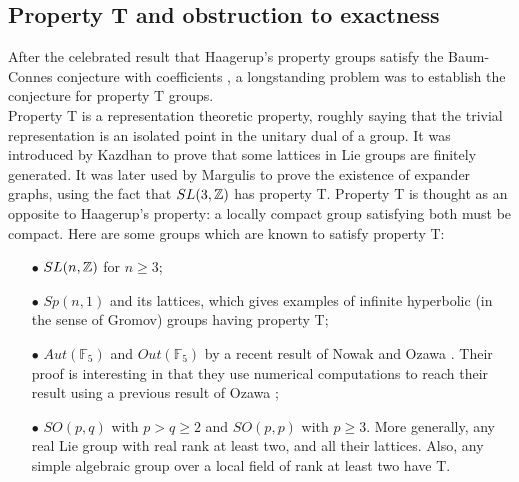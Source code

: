 \begin{enumerate}

\end{enumerate}

\subsection{Property T and obstruction to exactness}

After the celebrated result that Haagerup's property groups satisfy the Baum-Connes conjecture with coefficients \cite{HigsonKasparov}, a longstanding problem was to establish the conjecture for property T groups. \\

Property T is a representation theoretic property, roughly saying that the trivial representation is an isolated point in the unitary dual of a group. It was introduced by Kazdhan \cite{kazhdan} to prove that some lattices in Lie groups are finitely generated. It was later used by Margulis to prove the existence of expander graphs, using the fact that $SL(3, \mathbb{Z})$ has property T. Property T is thought as an opposite to Haagerup's property: a locally compact group satisfying both must be compact. Here are some groups which are known to satisfy property T: 

\begin{itemize}
\item[$\bullet$] $SL(n,\mathbb{Z})$ for $n\geq 3$;  
\item[$\bullet$] $Sp(n,1)$ and its lattices, which gives examples of infinite hyperbolic (in the sense of Gromov) groups having property T;
\item[$\bullet$] $Aut(\mathbb F_5)$ and $Out(\mathbb F_5)$ by a recent result of Nowak and Ozawa \cite{NowakOzawaF5}. Their proof is interesting in that they use numerical computations to reach their result using a previous result of Ozawa \cite{OzawaT};
\item[$\bullet$] $SO(p, q)$ with $p > q \geq 2$ and $SO(p, p)$ with $p \geq 3$. More generally, any real Lie group with real rank at least two, and all their lattices. Also, any simple algebraic group over a local field of rank at least two have T.
\end{itemize}

